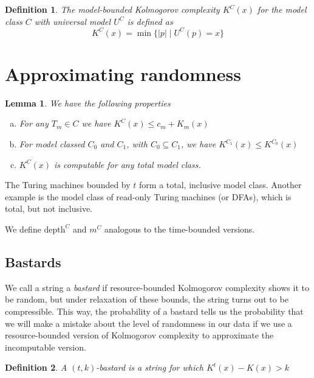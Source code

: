 \documentclass[10pt,a4paper,oneside]{article}
\newtheorem{lma}{Lemma}
\newtheorem{dfn}{Definition}
\begin{document}
\begin{dfn}
The model-bounded Kolmogorov complexity $K^C(x)$ for the model class $C$ with universal model $U^C$ is defined as
\[
K^C(x) = \min \{|p| \mid U^C(p) = x\}
\]  
\end{dfn}


\section*{Approximating randomness}

\begin{lma}
We have the following properties
\begin{enumerate}[(a)]
  \item For any $T_m \in C$ we have $K^C(x) \leq c_m + K_m(x)$
  \item For model classed $C_0$ and $C_1$, with $C_0 \subseteq C_1$, we have $K^{C_1}(x) \leq K^{C_0}(x)$
  \item $K^C(x)$ is computable for any total model class.
\end{enumerate}
\end{lma}

The Turing machines bounded by $t$ form a total, inclusive model class. Another example is the model class of read-only Turing machines (or DFAs), which is total, but not inclusive.  

We define $\text{depth}^C$ and $m^C$ analogous to the time-bounded versions.


\subsection*{Bastards}

We call a string a \emph{bastard} if resource-bounded Kolmogorov complexity shows it to be random, but under relaxation of these bounds, the string turns out to be compressible. This way, the probability of a bastard tells us the probability that we will make a mistake about the level of randomness in our data if we use a resource-bounded version of Kolmogorov complexity to approximate the incomputable version.

\begin{dfn}
A \emph{$(t, k)$-bastard} is a string for which $K^t(x) - K(x) > k$
\end{dfn}
\end{document}
